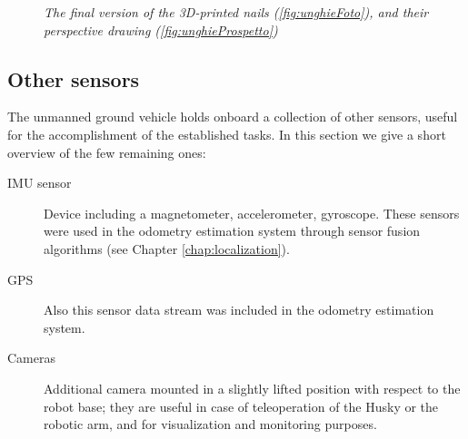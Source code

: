 \begin{figure}
	\centering
	\caption{\textit{The final version of the 3D-printed nails (\ref{fig:unghieFoto}), and their 	perspective drawing (\ref{fig:unghieProspetto})}}
\end{figure}



\subsection{Other sensors}
The unmanned ground vehicle holds onboard a collection of other sensors, useful for the accomplishment of the established tasks. In this section we give a short overview of the few remaining ones:
\begin{description}
	\item[{IMU} sensor] Device including a magnetometer, accelerometer, gyroscope. These sensors were used in the odometry estimation system through sensor fusion algorithms (see Chapter \ref{chap:localization}).
	\item[GPS] Also this sensor data stream was included in the odometry estimation system.
	\item [Cameras] Additional camera mounted in a slightly lifted position with respect to the robot base; they are useful in case of teleoperation of the Husky or the robotic arm, and for visualization and monitoring purposes.
\end{description}

